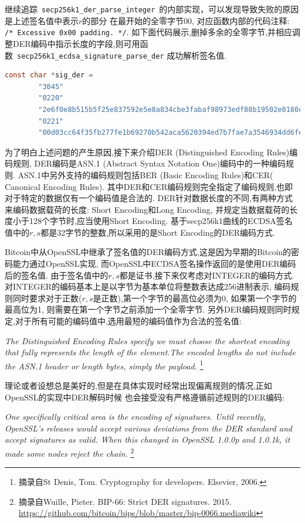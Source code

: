 \documentclass{article}
\newcommand{\code}[1]{\lstinline!#1!}
\begin{document}
继续追踪~\code{secp256k1_der_parse_integer}~的内部实现，可以发现导致失败的原因是上述签名值中表示$r$的部分
在最开始的全零字节$00$, 对应函数内部的代码注释: \code{/* Excessive 0x00 padding. */}.
如下面代码展示,删掉多余的全零字节,并相应调整DER编码中指示长度的字段,则可用函数~\code{secp256k1_ecdsa_signature_parse_der}
成功解析签名值.

\begin{lstlisting}[language=c, caption = 可成功解析的DER编码的ECDSA签名, label=lst-gooddersig]
    const char *sig_der =
        "3045"
        "0220"
        "2e6f0e8b515b5f25e837592e5e8a834cbe3fabaf98973edf88b19502e0180c2d"
        "0221"
        "00d03cc64f35fb277fe1b69270b542aca5620394ed7b7fae7a3546934dd6fe4288";
\end{lstlisting}

为了明白上述问题的产生原因,接下来介绍DER (Distinguished Encoding Rules)编码规则,
DER编码是ASN.1 (Abstract Syntax Notation One)编码中的一种编码规则. 
ASN.1中另外支持的编码规则包括BER (Basic Encoding Rules)和CER( Canonical Encoding Rules).
其中DER和CER编码规则完全指定了编码规则,也即对于特定的数据仅有一个编码值是合法的.
DER针对数据长度的不同,有两种方式来编码数据载荷的长度: Short Encoding和Long Encoding, 
并规定当数据载荷的长度小于128个字节时,应当使用Short Encoding. 
基于secp256k1曲线的ECDSA签名值中的$r, s$都是32字节的整数,所以采用的是Short Encoding的DER编码方式.

Bitcoin中从OpenSSL中继承了签名值的DER编码方式,这是因为早期的Bitcoin的密码能力通过OpenSSL实现,
而OpenSSL中ECDSA签名操作返回的是使用DER编码后的签名值.
由于签名值中的$r,s$都是证书,接下来仅考虑对INTEGER的编码方式.
对INTEGER的编码基本上是以字节为基本单位将整数表达成256进制表示,
编码规则同时要求对于正数($r,s$是正数),第一个字节的最高位必须为0,
如果第一个字节的最高位为1, 则需要在第一个字节之前添加一个全零字节.
另外DER编码规则同时规定,对于所有可能的编码值中,选用最短的编码值作为合法的签名值:

\textit{
The Distinguished Encoding Rules specify we must choose the shortest encoding that fully represents the length of the element.The encoded lengths do not include the ASN.1 header or length bytes, simply the payload.
}\footnote{
摘录自St Denis, Tom. Cryptography for developers. Elsevier, 2006.}

理论或者设想总是美好的,但是在具体实现时经常出现偏离规则的情况,正如OpenSSL的实现中DER解码时候
也会接受没有严格遵循前述规则的DER编码:

\textit{
One specifically critical area is the encoding of signatures. Until recently, OpenSSL's releases would accept various deviations from the DER standard and accept signatures as valid. When this changed in OpenSSL 1.0.0p and 1.0.1k, it made some nodes reject the chain.
}\footnote{
摘录自Wuille, Pieter. BIP-66: Strict DER signatures. 2015. \url{https://github.com/bitcoin/bips/blob/master/bip-0066.mediawiki}
}
\end{document}
